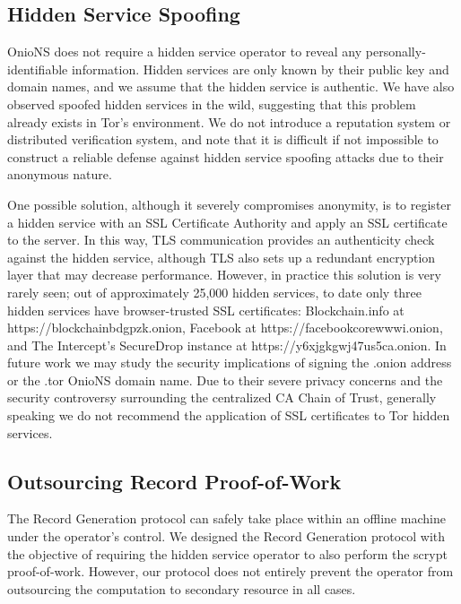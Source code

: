 \subsection{Hidden Service Spoofing}

OnioNS does not require a hidden service operator to reveal any personally-identifiable information. Hidden services are only known by their public key and domain names, and we assume that the hidden service is authentic. We have also observed spoofed hidden services in the wild, suggesting that this problem already exists in Tor's environment. We do not introduce a reputation system or distributed verification system, and note that it is difficult if not impossible to construct a reliable defense against hidden service spoofing attacks due to their anonymous nature. 

One possible solution, although it severely compromises anonymity, is to register a hidden service with an SSL Certificate Authority and apply an SSL certificate to the server. In this way, TLS communication provides an authenticity check against the hidden service, although TLS also sets up a redundant encryption layer that may decrease performance. However, in practice this solution is very rarely seen; out of approximately 25,000 hidden services\cite{TorMetrics}\cite{kadianakis2015extrapolating}, to date only three hidden services have browser-trusted SSL certificates: Blockchain.info at https://blockchainbdgpzk.onion, Facebook at https://facebookcorewwwi.onion, and The Intercept's SecureDrop instance at https://y6xjgkgwj47us5ca.onion. In future work we may study the security implications of signing the .onion address or the .tor OnioNS domain name. Due to their severe privacy concerns and the security controversy surrounding the centralized CA Chain of Trust, generally speaking we do not recommend the application of SSL certificates to Tor hidden services. 

\subsection{Outsourcing Record Proof-of-Work}


The Record Generation protocol can safely take place within an offline machine under the operator's control. We designed the Record Generation protocol with the objective of requiring the hidden service operator to also perform the scrypt proof-of-work. However, our protocol does not entirely prevent the operator from outsourcing the computation to secondary resource in all cases.


